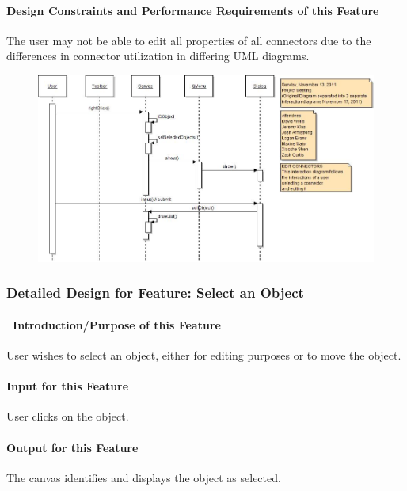 \documentclass[twoside,letterpaper]{article}
\begin{document}
{\paragraph{Design Constraints and Performance Requirements of this Feature}
{\color{black}
The user may not be able to edit all properties of all connectors due to the differences in connector utilization in differing UML diagrams.
}
\bigskip
\bigskip

\begin{figure}[h]
\centering
\includegraphics[width=6.0in]{IntEditConn.jpg}
\end{figure}

\clearpage

\subsubsection{Detailed Design for Feature: Select an Object}

\paragraph[\ Introduction/Purpose of this Feature]
{\ Introduction/Purpose of this Feature}
{\color{black}
User wishes to select an object, either for editing purposes or to move the object.
}

\paragraph[Input for this Feature]{Input for this Feature}
{\color{black}
User clicks on the object.
}

\paragraph{Output for this Feature}
{\color{black}
The canvas identifies and displays the object as selected.
}

}
\end{document}
